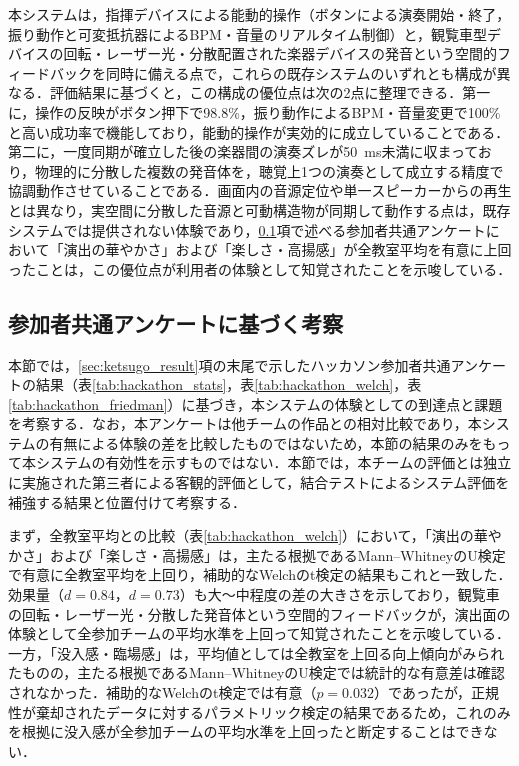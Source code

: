 本システムは，指揮デバイスによる能動的操作（ボタンによる演奏開始・終了，振り動作と可変抵抗器によるBPM・音量のリアルタイム制御）と，観覧車型デバイスの回転・レーザー光・分散配置された楽器デバイスの発音という空間的フィードバックを同時に備える点で，これらの既存システムのいずれとも構成が異なる．評価結果に基づくと，この構成の優位点は次の2点に整理できる．第一に，操作の反映がボタン押下で98.8\%，振り動作によるBPM・音量変更で100\%と高い成功率で機能しており，能動的操作が実効的に成立していることである．第二に，一度同期が確立した後の楽器間の演奏ズレが\SI{50}{ms}未満に収まっており，物理的に分散した複数の発音体を，聴覚上1つの演奏として成立する精度で協調動作させていることである．画面内の音源定位や単一スピーカーからの再生とは異なり，実空間に分散した音源と可動構造物が同期して動作する点は，既存システムでは提供されない体験であり，\ref{sec:kousatsu_kyoutsuu}項で述べる参加者共通アンケートにおいて「演出の華やかさ」および「楽しさ・高揚感」が全教室平均を有意に上回ったことは，この優位点が利用者の体験として知覚されたことを示唆している．

\subsection{参加者共通アンケートに基づく考察}
\label{sec:kousatsu_kyoutsuu}

本節では，\ref{sec:ketsugo_result}項の末尾で示したハッカソン参加者共通アンケートの結果（表\ref{tab:hackathon_stats}，表\ref{tab:hackathon_welch}，表\ref{tab:hackathon_friedman}）に基づき，本システムの体験としての到達点と課題を考察する．なお，本アンケートは他チームの作品との相対比較であり，本システムの有無による体験の差を比較したものではないため，本節の結果のみをもって本システムの有効性を示すものではない．本節では，本チームの評価とは独立に実施された第三者による客観的評価として，結合テストによるシステム評価を補強する結果と位置付けて考察する．

まず，全教室平均との比較（表\ref{tab:hackathon_welch}）において，「演出の華やかさ」および「楽しさ・高揚感」は，主たる根拠であるMann--WhitneyのU検定で有意に全教室平均を上回り，補助的なWelchのt検定の結果もこれと一致した．効果量（$d=0.84$，$d=0.73$）も大〜中程度の差の大きさを示しており，観覧車の回転・レーザー光・分散した発音体という空間的フィードバックが，演出面の体験として全参加チームの平均水準を上回って知覚されたことを示唆している．一方，「没入感・臨場感」は，平均値としては全教室を上回る向上傾向がみられたものの，主たる根拠であるMann--WhitneyのU検定では統計的な有意差は確認されなかった．補助的なWelchのt検定では有意（$p=0.032$）であったが，正規性が棄却されたデータに対するパラメトリック検定の結果であるため，これのみを根拠に没入感が全参加チームの平均水準を上回ったと断定することはできない．

